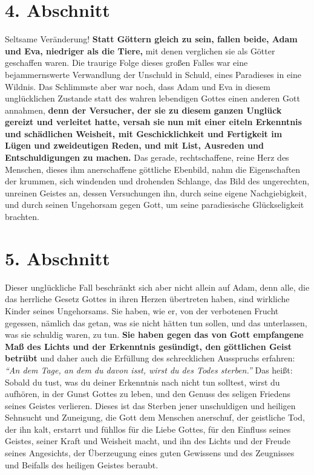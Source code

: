 \section{4. Abschnitt} \label{kap7_ab4}

Seltsame Veränderung! \textbf{Statt Göttern gleich zu sein, fallen beide, Adam
und Eva,
niedriger als die Tiere,} mit denen verglichen sie als Götter geschaffen waren.
Die traurige Folge dieses großen Falles war eine bejammernswerte Verwandlung
der Unschuld in Schuld, eines Paradieses in eine Wildnis.
Das
Schlimmste aber
war noch, dass Adam und Eva in diesem unglücklichen Zustande statt des wahren
lebendigen Gottes einen anderen Gott annahmen, \textbf{denn der
Versucher, der sie zu
diesem ganzen Unglück gereizt und verleitet hatte, versah sie nun mit einer
eiteln Erkenntnis und schädlichen
Weisheit, mit Geschicklichkeit und
Fertigkeit
im Lügen und zweideutigen Reden, und mit
List, Ausreden und Entschuldigungen zu
machen.} Das gerade, rechtschaffene, reine Herz des Menschen, dieses ihm
anerschaffene göttliche Ebenbild, nahm die Eigenschaften der krummen, sich
windenden und drohenden Schlange, das Bild des
ungerechten, unreinen Geistes an,
dessen Versuchungen ihn, durch seine eigene Nachgiebigkeit, und durch seinen
Ungehorsam gegen Gott, um seine paradiesische
Glückseligkeit brachten.

\section{5. Abschnitt} \label{kap7_ab5}

Dieser unglückliche Fall beschränkt sich aber nicht allein auf Adam, denn alle,
die das herrliche Gesetz Gottes in ihren Herzen übertreten haben, sind wirkliche
Kinder seines Ungehorsams. Sie haben, wie er, von der verbotenen
Frucht
gegessen, nämlich das getan, was sie nicht hätten tun sollen, und das
unterlassen, was sie schuldig waren, zu tun. \textbf{Sie haben gegen das von
Gott
empfangene Maß des Lichts und der Erkenntnis gesündigt, den göttlichen Geist
betrübt} und daher auch die Erfüllung des schrecklichen Ausspruchs erfahren:
\textit{"`An dem Tage, an dem du davon isst, wirst du des Todes
sterben."'}
Das heißt: Sobald du tust, was du deiner Erkenntnis nach nicht tun
solltest, wirst du aufhören, in der Gunst Gottes zu
leben, und den Genuss des
seligen Friedens seines Geistes verlieren. Dieses ist das
Sterben jener
unschuldigen und heiligen Sehnsucht und Zuneigung, die Gott dem Menschen
anerschuf, der geistliche Tod, der ihn kalt, erstarrt und
fühllos für die Liebe
Gottes, für den Einfluss seines Geistes, seiner Kraft und
Weisheit macht, und ihn
des Lichts und der Freude seines Angesichts, der Überzeugung eines guten
Gewissens und des Zeugnisses und Beifalls des heiligen Geistes beraubt.

